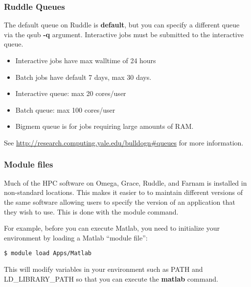 \documentclass[10pt]{beamer}
\begin{document}
\begin{frame}
\frametitle{Ruddle Queues}
The default queue on Ruddle is \textbf{default}, but you can specify
a different queue via the qsub \textbf{-q} argument.  Interactive jobs
must be submitted to the interactive queue.

\begin{itemize}
\item Interactive jobs have max walltime of 24 hours
\item Batch jobs have default 7 days, max 30 days.
\item Interactive queue: max 20 cores/user
\item Batch queue: max 100 cores/user
\item Bigmem queue is for jobs requiring large amounts of RAM.
\end{itemize}

See \url{http://research.computing.yale.edu/bulldogn\#queues} for more information.

\end{frame}

\begin{frame}[fragile]
\frametitle{Module files}
Much of the HPC software on Omega, Grace, Ruddle, and Farnam 
is installed in non-standard
locations. This makes it easier to to maintain different versions of the same
software allowing users to specify the version of an application that
they wish to use.  This is done with the module command.

\vskip10pt
For example, before you can execute Matlab, you need to initialize your
environment by loading a Matlab ``module file'':

\begin{verbatim}
$ module load Apps/Matlab
\end{verbatim}

This will modify variables in your environment such as PATH and
LD\_LIBRARY\_PATH so that you can execute the \textbf{matlab} command.
\end{frame}
\end{document}
